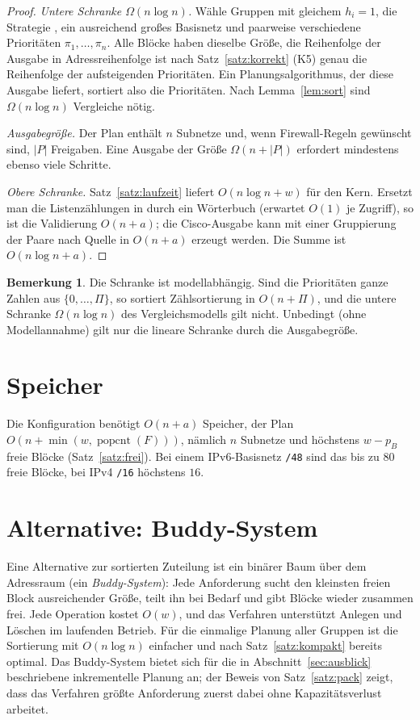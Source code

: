 \documentclass[a4paper,12pt, twoside]{report}
\theoremstyle{definition}
\newtheorem{bemerkung}{Bemerkung}
\DeclareMathOperator{\popcnt}{popcnt}
\newcommand{\code}[1]{\texttt{\detokenize{#1}}}
\begin{document}
\begin{proof}
	\emph{Untere Schranke $\Omega(n\log n)$.} Wähle Gruppen mit gleichem $h_i = 1$, die Strategie \code{fixed}, ein ausreichend großes Basisnetz und paarweise verschiedene Prioritäten $\pi_1,\ldots,\pi_n$. Alle Blöcke haben dieselbe Größe, die Reihenfolge der Ausgabe in Adressreihenfolge ist nach Satz~\ref{satz:korrekt} (K5) genau die Reihenfolge der aufsteigenden Prioritäten. Ein Planungsalgorithmus, der diese Ausgabe liefert, sortiert also die Prioritäten. Nach Lemma~\ref{lem:sort} sind $\Omega(n\log n)$ Vergleiche nötig.

	\emph{Ausgabegröße.} Der Plan enthält $n$ Subnetze und, wenn Firewall-Regeln gewünscht sind, $|P|$ Freigaben. Eine Ausgabe der Größe $\Omega(n + |P|)$ erfordert mindestens ebenso viele Schritte.

	\emph{Obere Schranke.} Satz~\ref{satz:laufzeit} liefert $O(n\log n + w)$ für den Kern. Ersetzt man die Listenzählungen in \code{_check_groups} durch ein Wörterbuch (erwartet $O(1)$ je Zugriff), so ist die Validierung $O(n + a)$; die Cisco-Ausgabe kann mit einer Gruppierung der Paare nach Quelle in $O(n+a)$ erzeugt werden. Die Summe ist $O(n\log n + a)$.
\end{proof}

\begin{bemerkung}
	Die Schranke ist modellabhängig. Sind die Prioritäten ganze Zahlen aus $\{0,\ldots,\Pi\}$, so sortiert Zählsortierung in $O(n + \Pi)$, und die untere Schranke $\Omega(n\log n)$ des Vergleichsmodells gilt nicht. Unbedingt (ohne Modellannahme) gilt nur die lineare Schranke durch die Ausgabegröße.
\end{bemerkung}

\section{Speicher}

Die Konfiguration benötigt $O(n + a)$ Speicher, der Plan $O(n + \min(w, \popcnt(F)))$, nämlich $n$ Subnetze und höchstens $w - p_B$ freie Blöcke (Satz~\ref{satz:frei}). Bei einem IPv6-Basisnetz \texttt{/48} sind das bis zu $80$ freie Blöcke, bei IPv4 \texttt{/16} höchstens $16$.

\section{Alternative: Buddy-System}

Eine Alternative zur sortierten Zuteilung ist ein binärer Baum über dem Adressraum (ein \emph{Buddy-System}): Jede Anforderung sucht den kleinsten freien Block ausreichender Größe, teilt ihn bei Bedarf und gibt Blöcke wieder zusammen frei. Jede Operation kostet $O(w)$, und das Verfahren unterstützt Anlegen und Löschen im laufenden Betrieb. Für die einmalige Planung aller Gruppen ist die Sortierung mit $O(n\log n)$ einfacher und nach Satz~\ref{satz:kompakt} bereits optimal. Das Buddy-System bietet sich für die in Abschnitt~\ref{sec:ausblick} beschriebene inkrementelle Planung an; der Beweis von Satz~\ref{satz:pack} zeigt, dass das Verfahren \glqq größte Anforderung zuerst\grqq{} dabei ohne Kapazitätsverlust arbeitet.
\end{document}
